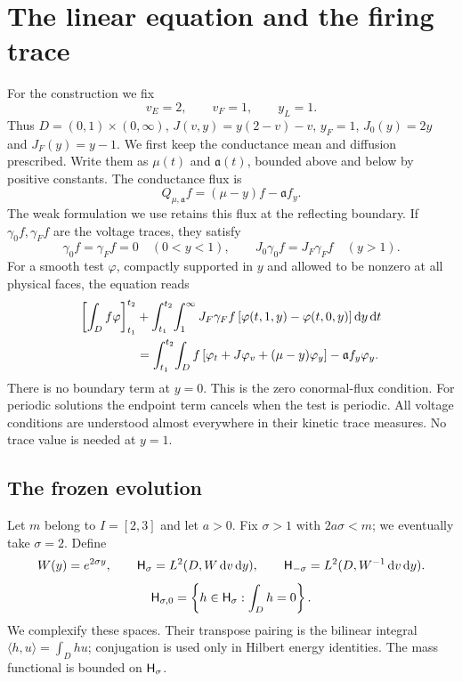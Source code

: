 \section{The linear equation and the firing trace}\label{sec:linear}

For the construction we fix
\begin{equation}\label{eq:physical-choice}
 v_E=2,\qquad v_F=1,\qquad y_L=1.
\end{equation}
Thus $D=(0,1)\times(0,\infty)$,
$J(v,y)=y(2-v)-v$, $y_F=1$, $J_0(y)=2y$ and $J_F(y)=y-1$.
We first keep the conductance mean and diffusion prescribed. Write them as
$\mu(t)$ and $\mathfrak a(t)$, bounded above and below by positive constants.
The conductance flux is
\[
 Q_{\mu,\mathfrak a}f=(\mu-y)f-\mathfrak a f_y.
\]
The weak formulation we use retains this flux at the reflecting boundary.
If $\gamma_0 f,\gamma_F f$ are the voltage traces, they satisfy
\begin{equation}\label{eq:voltage-traces}
 \gamma_0 f=\gamma_F f=0\quad(0<y<1),\qquad
 J_0\gamma_0 f=J_F\gamma_F f\quad(y>1).
\end{equation}
For a smooth test $\varphi$, compactly supported in $y$ and allowed to be
nonzero at all physical faces, the equation reads
\begin{align}\label{eq:weak-prescribed}
 \left[\int_D f\varphi\right]_{t_1}^{t_2}
 &+\int_{t_1}^{t_2}\!\int_1^\infty
 J_F\gamma_F f\,[\varphi(t,1,y)-\varphi(t,0,y)]\,\mathrm d y\,\mathrm d t\notag\\
 &=\int_{t_1}^{t_2}\!\int_D
 f\,[\varphi_t+J\varphi_v+(\mu-y)\varphi_y]
       -\mathfrak a f_y\varphi_y.
\end{align}
There is no boundary term at $y=0$. This is the zero conormal-flux condition.
For periodic solutions the endpoint term cancels when the test is periodic.
All voltage conditions are understood almost everywhere in their kinetic
trace measures. No trace value is needed at $y=1$.

\subsection{The frozen evolution}

Let $m$ belong to $I=[2,3]$ and let $a>0$. Fix $\sigma>1$ with
$2a\sigma<m$; we eventually take $\sigma=2$. Define
\[
 W(y)=e^{2\sigma y},\qquad
 \mathsf H_\sigma=L^2(D,W\,\mathrm d v\,\mathrm d y),\qquad
 \mathsf H_{-\sigma}=L^2(D,W^{-1}\,\mathrm d v\,\mathrm d y).
\]
\[
 \mathsf H_{\sigma,0}=\left\{h\in\mathsf H_\sigma:\int_Dh=0\right\}.
\]
We complexify these spaces. Their transpose pairing is the bilinear integral
$\langle h,u\rangle=\int_Dhu$; conjugation is used only in Hilbert energy
identities. The mass functional is bounded on $\mathsf H_\sigma$.

